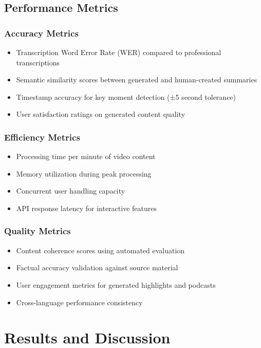 \documentclass{bscs}
\begin{document}
\section{Performance Metrics}

\subsection{Accuracy Metrics}

\begin{itemize}
\item Transcription Word Error Rate (WER) compared to professional transcriptions
\item Semantic similarity scores between generated and human-created summaries
\item Timestamp accuracy for key moment detection (±5 second tolerance)
\item User satisfaction ratings on generated content quality
\end{itemize}

\subsection{Efficiency Metrics}

\begin{itemize}
\item Processing time per minute of video content
\item Memory utilization during peak processing
\item Concurrent user handling capacity
\item API response latency for interactive features
\end{itemize}

\subsection{Quality Metrics}

\begin{itemize}
\item Content coherence scores using automated evaluation
\item Factual accuracy validation against source material
\item User engagement metrics for generated highlights and podcasts
\item Cross-language performance consistency
\end{itemize}

\chapter{Results and Discussion}
\end{document}
